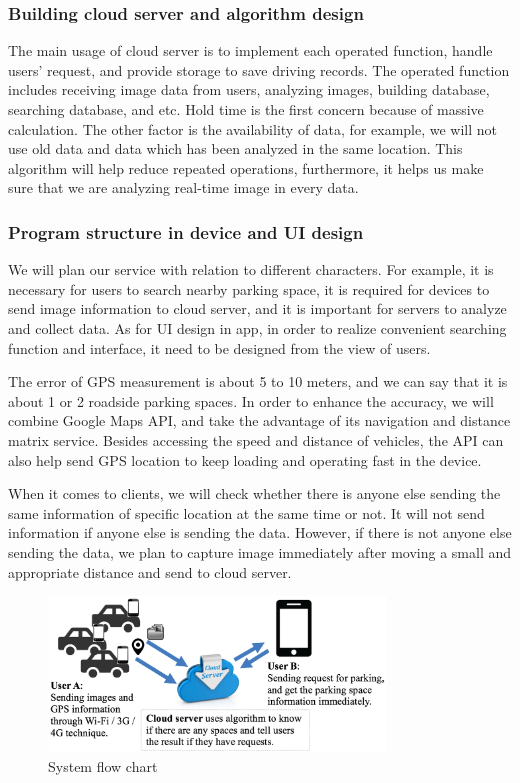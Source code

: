 \documentclass[runningheads,a4paper]{llncs}
\begin{document}
\begin{CJK}{UTF8}{bsmi}
%
\subsubsection{Building cloud server and algorithm design}
%

The main usage of cloud server is to implement each operated function,
handle users' request, and provide storage to save driving records. The
operated function includes receiving image data from users, analyzing
images, building database, searching database, and etc. Hold time is the
first concern because of massive calculation. The other factor is the
availability of data, for example, we will not use old data and data
which has been analyzed in the same location. This algorithm will help
reduce repeated operations, furthermore, it helps us make sure that we
are analyzing real-time image in every data.

%
\subsubsection{Program structure in device and UI design}
%

We will plan our service with relation to different characters. For
example, it is necessary for users to search nearby parking space, it is
required for devices to send image information to cloud server, and it
is important for servers to analyze and collect data. As for UI design
in app, in order to realize convenient searching function and interface,
it need to be designed from the view of users.

The error of GPS measurement is about 5 to 10 meters, and we can say
that it is about 1 or 2 roadside parking spaces. In order to enhance the
accuracy, we will combine Google Maps API, and take the advantage of its
navigation and distance matrix service. Besides accessing the speed and
distance of vehicles, the API can also help send GPS location to keep
loading and operating fast in the device.

When it comes to clients, we will check whether there is anyone else
sending the same information of specific location at the same time or
not. It will not send information if anyone else is sending the data.
However, if there is not anyone else sending the data, we plan to
capture image immediately after moving a small and appropriate distance
and send to cloud server.

\begin{figure}
	\centering
		\includegraphics[width=0.8\textwidth]{Figures/flowChart.png}
		\caption{System flow chart}
		\label{fig:system}
\end{figure}



\end{CJK}
\end{document}
